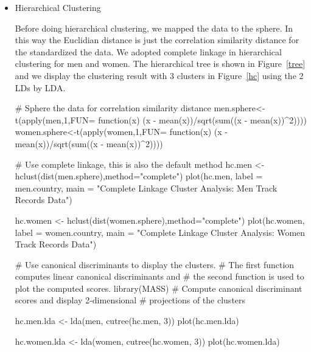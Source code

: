 \documentclass{article}
\begin{document}
	\begin{itemize}[leftmargin = 0 em]
	
	\item Hierarchical Clustering

	Before doing hierarchical clustering, we mapped the data to the sphere. In this way the Euclidian distance is just the correlation similarity distance for the standardized the data. We adopted complete linkage in hierarchical clustering for men and women. The hierarchical tree is shown in Figure~\ref{tree} and we display the clustering result with 3 clusters in Figure~\ref{hc} using the 2 LDs by LDA.
	\begin{rcode}
#  Sphere the data for correlation similarity distance
men.sphere<-t(apply(men,1,FUN= function(x) (x - mean(x))/sqrt(sum((x - mean(x))^2))))
women.sphere<-t(apply(women,1,FUN= function(x) (x - mean(x))/sqrt(sum((x - mean(x))^2))))

#  Use complete linkage, this is also the default method
hc.men <- hclust(dist(men.sphere),method="complete")
plot(hc.men, label = men.country,
main = "Complete Linkage Cluster Analysis: Men Track Records Data") 

hc.women <- hclust(dist(women.sphere),method="complete")
plot(hc.women, label = women.country,
     main = "Complete Linkage Cluster Analysis: Women Track Records Data") 

#  Use canonical discriminants to display the clusters.
#  The first function computes linear canonical discriminants and
#  the second function is used to plot the computed scores.
library(MASS)
#  Compute canonical discriminant scores and display 2-dimensional
#  projections of the clusters

hc.men.lda <- lda(men, cutree(hc.men, 3))  
plot(hc.men.lda)

hc.women.lda <- lda(women, cutree(hc.women, 3))  
plot(hc.women.lda)
	\end{rcode}


\end{itemize}
\end{document}
